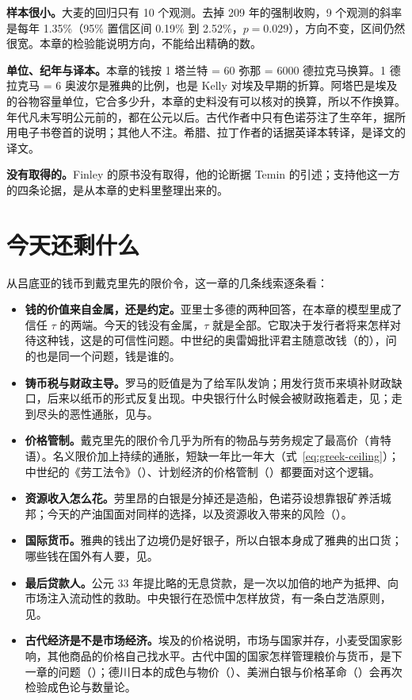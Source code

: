 \begin{deeper}[这些数字有多可靠]
\textbf{样本很小。}大麦的回归只有 10 个观测。去掉 209 年的强制收购，9 个观测的斜率是每年 1.35\%（95\% 置信区间 0.19\% 到 2.52\%，$p=0.029$），方向不变，区间仍然很宽。本章的检验能说明方向，不能给出精确的数。

\textbf{单位、纪年与译本。}本章的钱按 1 塔兰特 = 60 弥那 = 6000 德拉克马换算。1 德拉克马 = 6 奥波尔是雅典的比例，也是 Kelly 对埃及早期的折算。阿塔巴是埃及的谷物容量单位，它合多少升，本章的史料没有可以核对的换算，所以不作换算。年代凡未写明公元前的，都在公元以后。古代作者中只有色诺芬注了生卒年，据所用电子书卷首的说明；其他人不注。希腊、拉丁作者的话据英译本转译，是译文的译文。

\textbf{没有取得的。}Finley 的原书没有取得，他的论断据 Temin 的引述；支持他这一方的四条论据，是从本章的史料里整理出来的。
\end{deeper}

\section{今天还剩什么}\label{sec:greek-legacy}

从吕底亚的钱币到戴克里先的限价令，这一章的几条线索逐条看：
\begin{itemize}
\item \textbf{钱的价值来自金属，还是约定。}亚里士多德的两种回答，在本章的模型里成了信任 $\tau$ 的两端。今天的钱没有金属，$\tau$ 就是全部。它取决于发行者将来怎样对待这种钱，这是的可信性问题。中世纪的奥雷姆批评君主随意改钱（的），问的也是同一个问题，钱是谁的。
\item \textbf{铸币税与财政主导。}罗马的贬值是为了给军队发饷；用发行货币来填补财政缺口，后来以纸币的形式反复出现。中央银行什么时候会被财政拖着走，见；走到尽头的恶性通胀，见与。
\item \textbf{价格管制。}戴克里先的限价令几乎为所有的物品与劳务规定了最高价（肯特语）。名义限价加上持续的通胀，短缺一年比一年大（式~\eqref{eq:greek-ceiling}）；中世纪的《劳工法令》（）、计划经济的价格管制（）都要面对这个逻辑。
\item \textbf{资源收入怎么花。}劳里昂的白银是分掉还是造船，色诺芬设想靠银矿养活城邦；今天的产油国面对同样的选择，以及资源收入带来的风险（）。
\item \textbf{国际货币。}雅典的钱出了边境仍是好银子，所以白银本身成了雅典的出口货；哪些钱在国外有人要，见。
\item \textbf{最后贷款人。}公元 33 年提比略的无息贷款，是一次以加倍的地产为抵押、向市场注入流动性的救助。中央银行在恐慌中怎样放贷，有一条白芝浩原则，见。
\item \textbf{古代经济是不是市场经济。}埃及的价格说明，市场与国家并存，小麦受国家影响，其他商品的价格自己找水平。古代中国的国家怎样管理粮价与货币，是下一章的问题（）；德川日本的成色与物价（）、美洲白银与价格革命（）会再次检验成色论与数量论。
\end{itemize}

